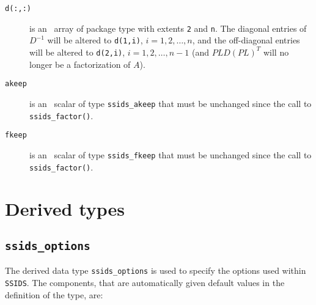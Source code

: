\documentclass{spral}
\begin{document}
\begin{description}

\item[\texttt{d(:,:)}] is an \intentin\ array of package type with
extents {\tt 2}  and {\tt n}. The diagonal entries
of ${D}^{-1}$ will be altered to {\tt d(1,i)}, $i = 1,2,\ldots,n$,
and the off-diagonal entries will be altered to
{\tt d(2,i)}, $i = 1,2,\ldots,n-1$ (and $PLD(PL)^T$ will no longer be
a factorization of $A$).

\item[\texttt{akeep}]  is an \intentin\ scalar of type {\tt ssids\_akeep} that
must be unchanged since the call to {\tt ssids\_factor()}.

\item[\texttt{fkeep}]  is an \intentinout\ scalar of type {\tt ssids\_fkeep}
that must be unchanged since the call to {\tt ssids\_factor()}.

\end{description}


\section{Derived types}
\subsection{\texttt{ssids\_options}}
\label{typeoptions}

The derived data type {\tt ssids\_options} is used to specify the options used
within \texttt{SSIDS}. The components, that are automatically
given default values in the definition of the type, are: \\

\end{document}
